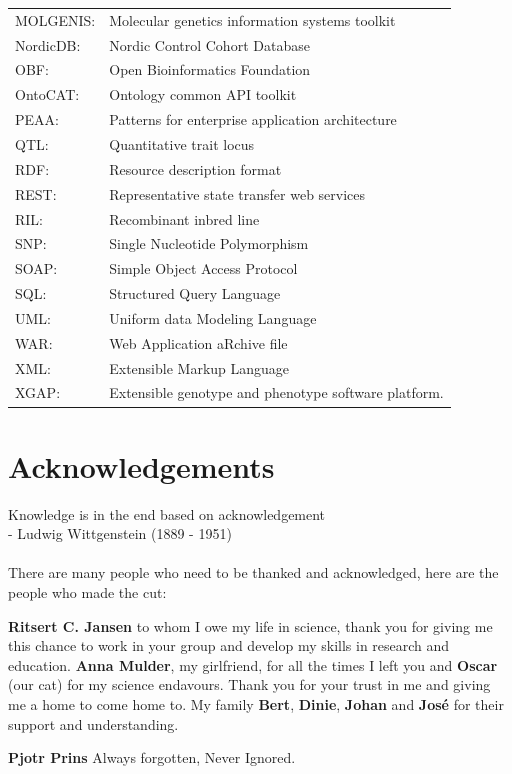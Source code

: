 {\begin{tabular}{ l l }
MOLGENIS:    & Molecular genetics information systems toolkit\\
NordicDB:    & Nordic Control Cohort Database\\
OBF:         & Open Bioinformatics Foundation\\
OntoCAT:     & Ontology common API toolkit\\
PEAA:        & Patterns for enterprise application architecture\\
QTL:         & Quantitative trait locus\\
RDF:         & Resource description format\\
REST:        & Representative state transfer web services\\
RIL:         & Recombinant inbred line \\
SNP:         & Single Nucleotide Polymorphism\\
SOAP:        & Simple Object Access Protocol\\
SQL:         & Structured Query Language\\
UML:         & Uniform data Modeling Language\\
WAR:         & Web Application aRchive file\\
XML:         & Extensible Markup Language\\
XGAP:        & Extensible genotype and phenotype software platform. 
\end{tabular}
}
\newpage

\section{Acknowledgements}
Knowledge is in the end based on acknowledgement\\
- Ludwig Wittgenstein (1889 - 1951)\\\\

There are many people who need to be thanked and acknowledged, 
here are the people who made the cut:

{\bf Ritsert C. Jansen} to whom I owe my life in science, thank you for giving me this chance 
to work in your group and develop my skills in research and education. {\bf Anna Mulder}, my 
girlfriend, for all the times I left you and {\bf Oscar} (our cat) for my science endavours. 
Thank you for your trust in me and giving me a home to come home to.
My family {\bf Bert}, {\bf Dinie}, {\bf Johan} and {\bf Jos\'{e}} for their support and understanding. 

{\bf Pjotr Prins} Always forgotten, Never Ignored. 

